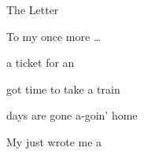 \begin{SBSong}{The Letter}
\begin{SBVerse}
    To my  once more \ldots   
  \end{SBVerse}
  \begin{SBVerse}
     a ticket for an  
    
     got time to take a  train 
    
     days are gone  a-goin' home 
    
    My  just wrote me a  
  \end{SBVerse}
\end{SBSong}
